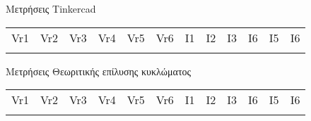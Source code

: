 \documentclass[11pt]{article}
\begin{document}
Μετρήσεις Tinkercad
\begin{center}
\begin{tabular}{llllllllllll}
Vr1 & Vr2 & Vr3 & Vr4 & Vr5 & Vr6 & I1 & I2 & I3 & I6 & I5 & I6\\
 &  &  &  &  &  &  &  &  &  &  & \\
\end{tabular}
\end{center}

Μετρήσεις Θεωριτικής επίλυσης κυκλώματος
\begin{center}
\begin{tabular}{llllllllllll}
Vr1 & Vr2 & Vr3 & Vr4 & Vr5 & Vr6 & I1 & I2 & I3 & I6 & I5 & I6\\
 &  &  &  &  &  &  &  &  &  &  & \\
\end{tabular}
\end{center}
\end{document}
